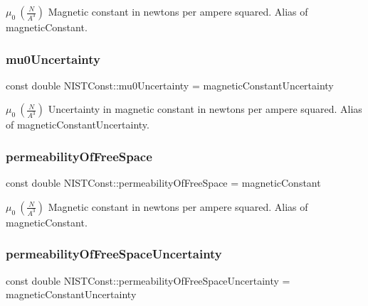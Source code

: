 $\mu_0 \ (\frac{N}{A^3})$ Magnetic constant in newtons per ampere squared. Alias of magnetic\+Constant. \mbox{\label{group___n_i_s_t_const-_magnetic_constant_ga8c9dd97d5f05e75e3eb2b2daaa0e1b7e}} 
\subsubsection{\texorpdfstring{mu0\+Uncertainty}{mu0Uncertainty}}
{\footnotesize\ttfamily const double N\+I\+S\+T\+Const\+::mu0\+Uncertainty = magnetic\+Constant\+Uncertainty}

$\mu_0 \ (\frac{N}{A^3})$ Uncertainty in magnetic constant in newtons per ampere squared. Alias of magnetic\+Constant\+Uncertainty. \mbox{\label{group___n_i_s_t_const-_magnetic_constant_gad7321a170873a7532ecfb8383d827d1e}} 
\subsubsection{\texorpdfstring{permeability\+Of\+Free\+Space}{permeabilityOfFreeSpace}}
{\footnotesize\ttfamily const double N\+I\+S\+T\+Const\+::permeability\+Of\+Free\+Space = magnetic\+Constant}

$\mu_0 \ (\frac{N}{A^3})$ Magnetic constant in newtons per ampere squared. Alias of magnetic\+Constant. \mbox{\label{group___n_i_s_t_const-_magnetic_constant_gab95a7a90e35194a4d31736c375e57bde}} 
\subsubsection{\texorpdfstring{permeability\+Of\+Free\+Space\+Uncertainty}{permeabilityOfFreeSpaceUncertainty}}
{\footnotesize\ttfamily const double N\+I\+S\+T\+Const\+::permeability\+Of\+Free\+Space\+Uncertainty = magnetic\+Constant\+Uncertainty}

